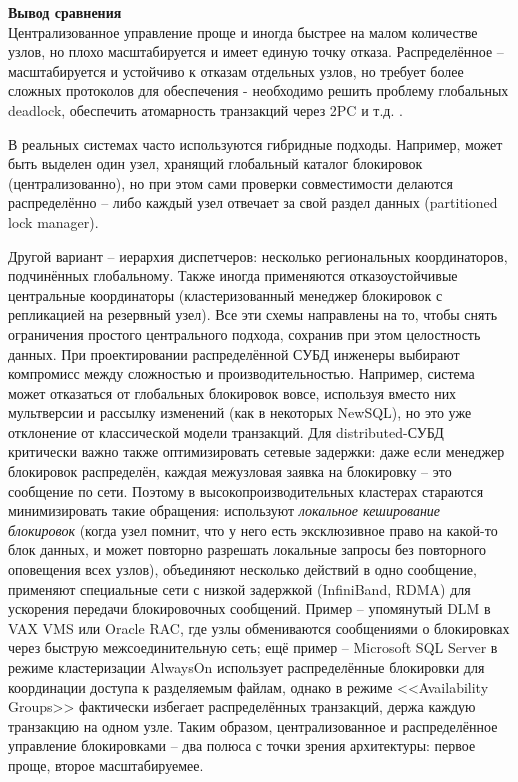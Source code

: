  \textbf{Вывод сравнения} ~\\
 Централизованное управление проще и иногда быстрее на малом количестве узлов, но плохо масштабируется и имеет единую точку отказа. Распределённое – масштабируется и устойчиво к отказам отдельных узлов, но требует более сложных протоколов для обеспечения - необходимо решить проблему глобальных deadlock, обеспечить атомарность транзакций через 2PC и т.д. \autocite{Silberschatz}. 
 
 В реальных системах часто используются гибридные подходы. Например, может быть выделен один узел, хранящий глобальный каталог блокировок (централизованно), но при этом сами проверки совместимости делаются распределённо – либо каждый узел отвечает за свой раздел данных (partitioned lock manager). 
 
 Другой вариант – иерархия диспетчеров: несколько региональных координаторов, подчинённых глобальному. Также иногда применяются отказоустойчивые центральные координаторы (кластеризованный менеджер блокировок с репликацией на резервный узел). Все эти схемы направлены на то, чтобы снять ограничения простого центрального подхода, сохранив при этом целостность данных. При проектировании распределённой СУБД инженеры выбирают компромисс между сложностью и производительностью. Например, система может отказаться от глобальных блокировок вовсе, используя вместо них мультверсии и рассылку изменений (как в некоторых NewSQL), но это уже отклонение от классической модели транзакций. Для distributed-СУБД критически важно также оптимизировать сетевые задержки: даже если менеджер блокировок распределён, каждая межузловая заявка на блокировку – это сообщение по сети. Поэтому в высокопроизводительных кластерах стараются минимизировать такие обращения: используют \textit{локальное кеширование блокировок} (когда узел помнит, что у него есть эксклюзивное право на какой-то блок данных, и может повторно разрешать локальные запросы без повторного оповещения всех узлов), объединяют несколько действий в одно сообщение, применяют специальные сети с низкой задержкой (InfiniBand, RDMA) для ускорения передачи блокировочных сообщений. Пример – упомянутый DLM в VAX VMS или Oracle RAC, где узлы обмениваются сообщениями о блокировках через быструю межсоединительную сеть; ещё пример – Microsoft SQL Server в режиме кластеризации AlwaysOn использует распределённые блокировки для координации доступа к разделяемым файлам, однако в режиме <<Availability Groups>> фактически избегает распределённых транзакций, держа каждую транзакцию на одном узле. Таким образом, централизованное и распределённое управление блокировками – два полюса с точки зрения архитектуры: первое проще, второе масштабируемее. 
 
